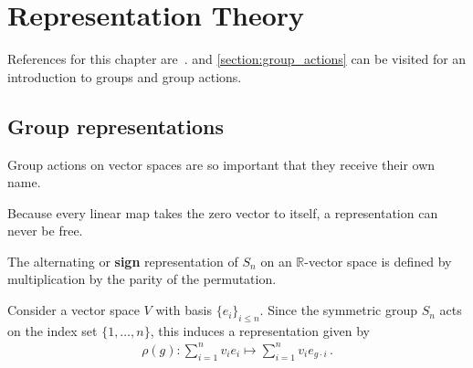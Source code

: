 \chapter{Representation Theory}

    References for this chapter are~\citet{jeevanjee_introduction_2015,fulton_representation_2004}.  and \cref{section:group_actions} can be visited for an introduction to groups and group actions.

\section{Group representations}

    Group actions on vector spaces are so important that they receive their own name.
    \begin{property}[Freeness]
        Because every linear map takes the zero vector to itself, a representation can never be free.
    \end{property}


    \begin{example}\label{rep:sign_representation}
        The alternating or \textbf{sign} representation of $S_n$ on an $\mathbb{R}$-vector space is defined by multiplication by the parity of the permutation.
    \end{example}

    \begin{example}\label{rep:permutation}
        Consider a vector space $V$ with basis $\{e_i\}_{i\leq n}$. Since the symmetric group $S_n$ acts on the index set $\{1,\ldots,n\}$, this induces a representation given by
        \begin{gather}
            \rho(g):\sum_{i=1}^nv_ie_i\mapsto\sum_{i=1}^nv_ie_{g\cdot i}\,.
        \end{gather}
    \end{example}

